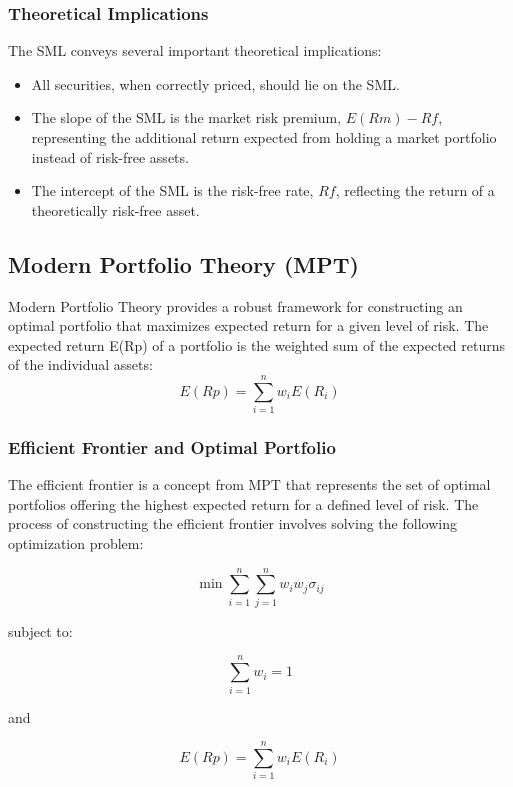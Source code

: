 \subsubsection{Theoretical Implications}
The SML conveys several important theoretical implications:
\begin{itemize}
    \item All securities, when correctly priced, should lie on the SML.
    \item The slope of the SML is the market risk premium, $E(Rm) - Rf$, representing the additional return expected from holding a market portfolio instead of risk-free assets.
    \item The intercept of the SML is the risk-free rate, $Rf$, reflecting the return of a theoretically risk-free asset.
\end{itemize}

\subsection{Modern Portfolio Theory (MPT)}
Modern Portfolio Theory provides a robust framework for constructing an optimal portfolio that maximizes expected return for a given level of risk. The expected return E(Rp) of a portfolio is the weighted sum of the expected returns of the individual assets:
\begin{equation}
E(Rp) = \sum_{i=1}^n w_iE(R_i)
\end{equation}

\subsubsection{Efficient Frontier and Optimal Portfolio}
The efficient frontier is a concept from MPT that represents the set of optimal portfolios offering the highest expected return for a defined level of risk. The process of constructing the efficient frontier involves solving the following optimization problem:

\begin{equation}
\min \sum_{i=1}^n \sum_{j=1}^n w_i w_j \sigma_{ij}
\end{equation}

subject to:

\begin{equation}
\sum_{i=1}^n w_i = 1
\end{equation}

and

\begin{equation}
E(Rp) = \sum_{i=1}^n w_iE(R_i)
\end{equation}

